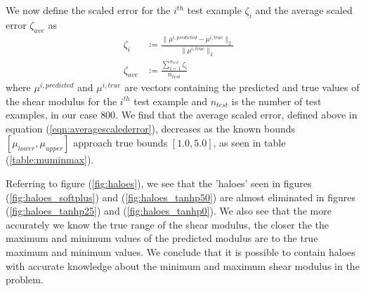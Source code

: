 \documentclass[12pt]{article}
\begin{document}
We now define the scaled error for the $i^{th}$  test example $\zeta_{i}$ and the average scaled error $\zeta_{ave}$ as
\begin{subequations}
  \begin{align}
  \zeta_{i} &\coloneqq \frac{\|\mu^{i,predicted} - \mu^{i,true}\|_{2}}{\|\mu^{i,true}\|_{2}}  &\label{eqn:scalederror}\\
  \zeta_{ave} &\coloneqq \frac{\sum_{i=1}^{n_{test}}\zeta_{i}}{n_{test}} &\label{eqn:averagescalederror}
  \end{align}
\end{subequations}
where $\mu^{i,predicted}$ and $\mu^{i,true}$ are vectors containing the predicted and true values of the shear modulus for the $i^{th}$ test example and $n_{test}$ is the number of test examples, in our case $800$. We find that the average scaled error, defined above in equation (\ref{eqn:averagescalederror}), decreases as the known bounds $[\mu_{lower},\mu_{upper}]$ approach true bounds $[1.0,5.0]$, as seen in table (\ref{table:muminmax}).

Referring to figure (\ref{fig:haloes}), we see that the 'haloes' seen in figures (\ref{fig:haloes_softplus}) and (\ref{fig:haloes_tanhp50}) are almost eliminated in figures (\ref{fig:haloes_tanhp25}) and (\ref{fig:haloes_tanhp0}). We also see that the more accurately we know the true range of the shear modulus, the closer the the maximum and minimum values of the predicted modulus are to the true maximum and minimum values. We conclude that it is possible to contain haloes with accurate knowledge about the minimum and maximum shear modulus in the problem.
\end{document}
